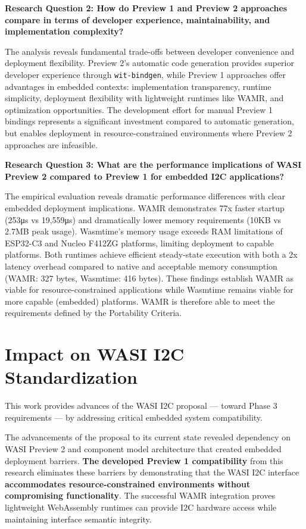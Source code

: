 \textbf{Research Question 2: How do Preview 1 and Preview 2 approaches compare in terms of developer experience, maintainability, and implementation complexity?}

The analysis reveals fundamental trade-offs between developer convenience and deployment flexibility. Preview 2's automatic code generation provides superior developer experience through \texttt{wit-bindgen}, while Preview 1 approaches offer advantages in embedded contexts: implementation transparency, runtime simplicity, deployment flexibility with lightweight runtimes like WAMR, and optimization opportunities. The development effort for manual Preview 1 bindings represents a significant investment compared to automatic generation, but enables deployment in resource-constrained environments where Preview 2 approaches are infeasible.

\textbf{Research Question 3: What are the performance implications of WASI Preview 2 compared to Preview 1 for embedded I2C applications?}

The empirical evaluation reveals dramatic performance differences with clear embedded deployment implications. WAMR demonstrates 77x faster startup (253μs vs 19,559μs) and dramatically lower memory requirements (10KB vs 2.7MB peak usage). Wasmtime's memory usage exceeds RAM limitations of ESP32-C3 and Nucleo F412ZG platforms, limiting deployment to capable platforms. Both runtimes achieve efficient steady-state execution with both a 2x latency overhead compared to native and acceptable memory consumption (WAMR: 327 bytes, Wasmtime: 416 bytes). These findings establish WAMR as viable for resource-constrained applications while Wasmtime remains viable for more capable (embedded) platforms. WAMR is therefore able to meet the requirements defined by the Portability Criteria.

\section*{Impact on WASI I2C Standardization}
\label{sec:standardization-impact}

This work provides advances of the WASI I2C proposal --- toward Phase 3 requirements --- by addressing critical embedded system compatibility.

The advancements of the proposal to its current state revealed dependency on WASI Preview 2 and component model architecture that created embedded deployment barriers. \textbf{The developed Preview 1 compatibility} from this research eliminates these barriers by demonstrating that the WASI I2C interface \textbf{accommodates resource-constrained environments without compromising functionality}. The successful WAMR integration proves lightweight WebAssembly runtimes can provide I2C hardware access while maintaining interface semantic integrity.


